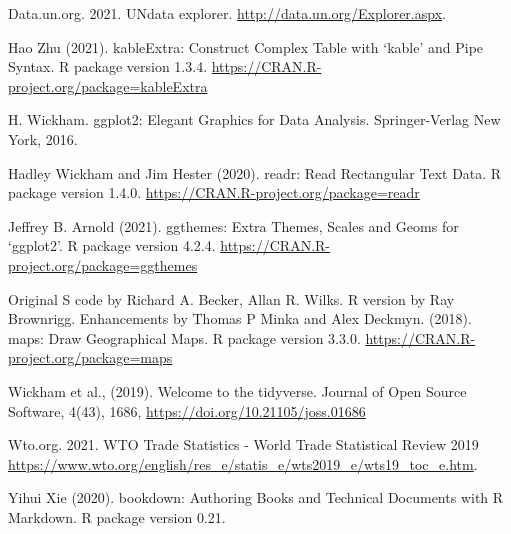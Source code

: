 \documentclass[11pt,a4paper,]{article}
\begin{document}
Data.un.org. 2021. UNdata \textbar{} explorer. \url{http://data.un.org/Explorer.aspx}.

Hao Zhu (2021). kableExtra: Construct Complex Table with `kable' and Pipe Syntax. R
package version 1.3.4. \url{https://CRAN.R-project.org/package=kableExtra}

H. Wickham. ggplot2: Elegant Graphics for Data Analysis. Springer-Verlag New York,
2016.

Hadley Wickham and Jim Hester (2020). readr: Read Rectangular Text Data. R package
version 1.4.0. \url{https://CRAN.R-project.org/package=readr}

Jeffrey B. Arnold (2021). ggthemes: Extra Themes, Scales and Geoms for `ggplot2'. R
package version 4.2.4. \url{https://CRAN.R-project.org/package=ggthemes}

Original S code by Richard A. Becker, Allan R. Wilks. R version by Ray Brownrigg.
Enhancements by Thomas P Minka and Alex Deckmyn. (2018). maps: Draw Geographical
Maps. R package version 3.3.0. \url{https://CRAN.R-project.org/package=maps}

Wickham et al., (2019). Welcome to the tidyverse. Journal of Open Source Software,
4(43), 1686, \url{https://doi.org/10.21105/joss.01686}

Wto.org. 2021. WTO \textbar{} Trade Statistics - World Trade Statistical Review 2019 \url{https://www.wto.org/english/res_e/statis_e/wts2019_e/wts19_toc_e.htm}.

Yihui Xie (2020). bookdown: Authoring Books and Technical Documents with R Markdown. R
package version 0.21.

\printbibliography
\end{document}
